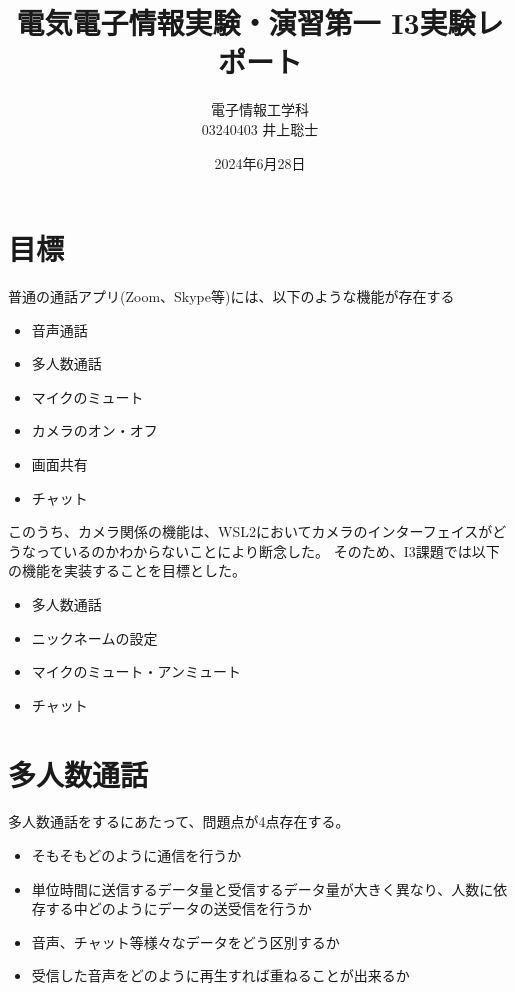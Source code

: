 \documentclass[a4paper]{ltjsarticle}
\title{電気電子情報実験・演習第一 I3実験レポート}
\author{電子情報工学科 \\ 03240403 井上聡士}
\date{2024年6月28日}
\begin{document}
\maketitle %
\section{目標}
普通の通話アプリ(Zoom、Skype等)には、以下のような機能が存在する
\begin{itemize}
    \item 音声通話
    \item 多人数通話
    \item マイクのミュート
    \item カメラのオン・オフ
    \item 画面共有
    \item チャット
\end{itemize}
このうち、カメラ関係の機能は、WSL2においてカメラのインターフェイスがどうなっているのかわからないことにより断念した。
そのため、I3課題では以下の機能を実装することを目標とした。
\begin{itemize}
    \item 多人数通話
    \item ニックネームの設定
    \item マイクのミュート・アンミュート
    \item チャット
\end{itemize}

\section{多人数通話}
多人数通話をするにあたって、問題点が4点存在する。
\begin{itemize}
    \item そもそもどのように通信を行うか
    \item 単位時間に送信するデータ量と受信するデータ量が大きく異なり、人数に依存する中どのようにデータの送受信を行うか
    \item 音声、チャット等様々なデータをどう区別するか
    \item 受信した音声をどのように再生すれば重ねることが出来るか
\end{itemize}
\end{document}
